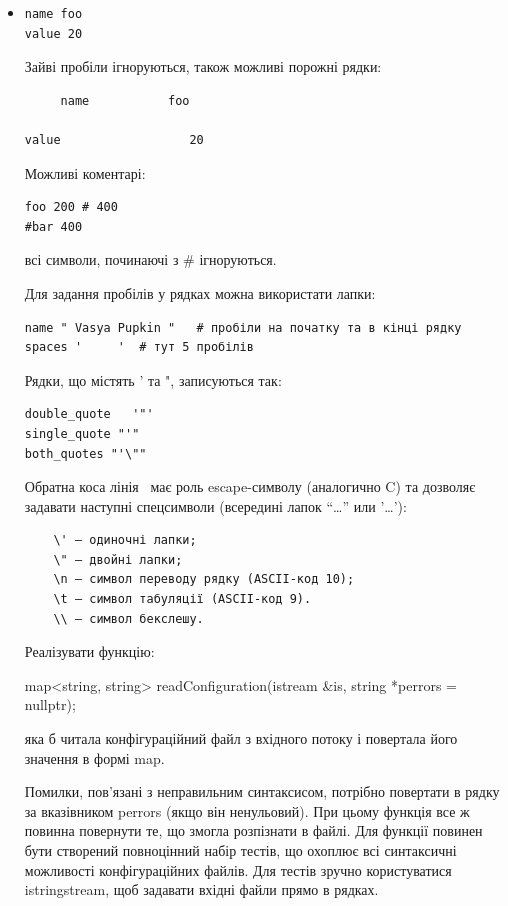 \documentclass[]{article}
\begin{document}
\begin{itemize}
\item
\begin{verbatim}
name foo
value 20
\end{verbatim}

  Зайві пробіли ігноруються, також можливі порожні рядки:

\begin{verbatim}
     name           foo

value                  20
\end{verbatim}

  Можливі коментарі:

\begin{verbatim}
foo 200 # 400
#bar 400
\end{verbatim}

  всі символи, починаючі з \# ігноруються.

  Для задання пробілів у рядках можна використати лапки:

\begin{verbatim}
name " Vasya Pupkin "   # пробіли на початку та в кінці рядку
spaces '     '  # тут 5 пробілів
\end{verbatim}

  Рядки, що містять ' та ", записуються так:

\begin{verbatim}
double_quote   '"'
single_quote "'"
both_quotes "'\""
\end{verbatim}

  Обратна коса лінія ~має роль escape-символу (аналогично C) та дозволяє
  задавати наступні спецсимволи (всередині лапок ``\ldots{}'' или
  '\ldots{}'):

\begin{verbatim}
    \' – одиночні лапки;
    \" – двойні лапки;
    \n – символ переводу рядку (ASCII-код 10);
    \t – символ табуляції (ASCII-код 9).
    \\ — символ бекслешу.
\end{verbatim}

  Реалізувати функцію:

  map\textless{}string, string\textgreater{} readConfiguration(istream
  \&is, string *perrors = nullptr);

  яка б читала конфігураційний файл з вхідного потоку і повертала його
  значення в формі map.

  Помилки, пов'язані з неправильним синтаксисом, потрібно повертати в
  рядку за вказівником perrors (якщо він ненульовий). При цьому функція
  все ж повинна повернути те, що змогла розпізнати в файлі. Для функції
  повинен бути створений повноцінний набір тестів, що охоплює всі
  синтаксичні можливості конфігураційних файлів. Для тестів зручно
  користуватися istringstream, щоб задавати вхідні файли прямо в рядках.
\end{itemize}
\end{document}
